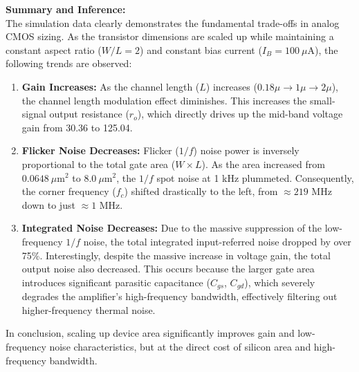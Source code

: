 \documentclass[12pt, a4paper]{article}
\begin{document}
\begin{table}[H]
    \centering
    \caption{Noise Performance Comparison for Scaled Device Geometries}
    \renewcommand{\arraystretch}{1.3}
\end{table}

\vspace{0.3cm}
\textbf{Summary and Inference:} \\
The simulation data clearly demonstrates the fundamental trade-offs in analog CMOS sizing. As the transistor dimensions are scaled up while maintaining a constant aspect ratio ($W/L = 2$) and constant bias current ($I_B = 100\ \mu\text{A}$), the following trends are observed:
\begin{enumerate}
    \item \textbf{Gain Increases:} As the channel length ($L$) increases ($0.18\mu \to 1\mu \to 2\mu$), the channel length modulation effect diminishes. This increases the small-signal output resistance ($r_o$), which directly drives up the mid-band voltage gain from 30.36 to 125.04.
    \item \textbf{Flicker Noise Decreases:} Flicker ($1/f$) noise power is inversely proportional to the total gate area ($W \times L$). As the area increased from $0.0648\ \mu\text{m}^2$ to $8.0\ \mu\text{m}^2$, the $1/f$ spot noise at 1 kHz plummeted. Consequently, the corner frequency ($f_c$) shifted drastically to the left, from $\approx 219 \text{ MHz}$ down to just $\approx 1 \text{ MHz}$.
    \item \textbf{Integrated Noise Decreases:} Due to the massive suppression of the low-frequency $1/f$ noise, the total integrated input-referred noise dropped by over 75\%. Interestingly, despite the massive increase in voltage gain, the total output noise also decreased. This occurs because the larger gate area introduces significant parasitic capacitance ($C_{gs}$, $C_{gd}$), which severely degrades the amplifier's high-frequency bandwidth, effectively filtering out higher-frequency thermal noise. 
\end{enumerate}
In conclusion, scaling up device area significantly improves gain and low-frequency noise characteristics, but at the direct cost of silicon area and high-frequency bandwidth.
\newpage
\end{document}
